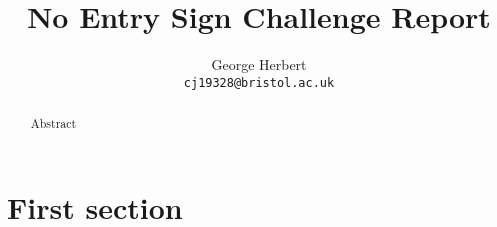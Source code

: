 \documentclass[onecolumn, 11pt, a4paper]{article}
\author{
  George Herbert\\
  \texttt{cj19328@bristol.ac.uk}
}
\title{No Entry Sign Challenge Report}
\begin{document}
\maketitle

\begin{abstract}
    Abstract
\end{abstract}

\section{First section}


\clearpage
\begin{thebibliography}{9}
\end{thebibliography}
    
\end{document}
